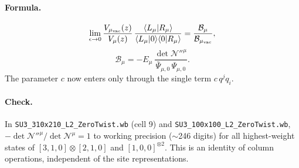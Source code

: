 \documentclass[10pt]{article}
\newcommand{\vac}{{\rm vac}}
\begin{document}
\paragraph{Formula.}
\begin{equation}
\lim_{\epsilon\to0}\frac{V_{\mu_\vac}(z)}{V_{\mu}(z)}\,
\frac{\langle L_\mu|R_\mu\rangle}{\langle L_\mu|0\rangle\langle0|R_\mu\rangle}
=\frac{\mathcal B_\mu}{\mathcal B_{\mu_\vac}},
\end{equation}
\begin{equation}
\mathcal B_\mu=-E_{\mu}\,\frac{\det\mathcal N''^\mu}{\bar\Psi_{\mu,0}\,\Psi_{\mu,0}}.
\end{equation}
The parameter $c$ now enters only through the single term $c\,q^jq_i$.

\paragraph{Check.} In \texttt{SU3\_310x210\_L2\_ZeroTwist.wb} (cell 9) and \texttt{SU3\_100x100\_L2\_ZeroTwist.wb}, $-\det\mathcal N''^\mu/\det\mathcal N^\mu=1$ to working precision ($\sim$246 digits) for all highest-weight states of $[3,1,0]\otimes[2,1,0]$ and $[1,0,0]^{\otimes2}$. This is an identity of column operations, independent of the site representations.
\end{document}
